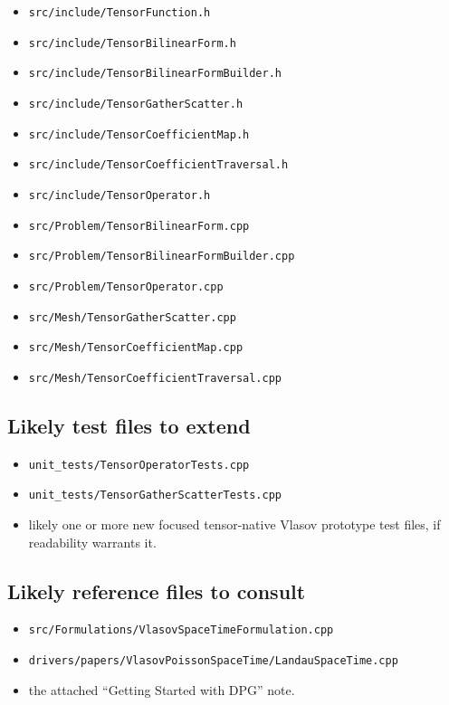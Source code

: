 \documentclass[11pt]{article}
\begin{document}
\begin{itemize}[leftmargin=2em]
\item \texttt{src/include/TensorFunction.h}
\item \texttt{src/include/TensorBilinearForm.h}
\item \texttt{src/include/TensorBilinearFormBuilder.h}
\item \texttt{src/include/TensorGatherScatter.h}
\item \texttt{src/include/TensorCoefficientMap.h}
\item \texttt{src/include/TensorCoefficientTraversal.h}
\item \texttt{src/include/TensorOperator.h}
\item \texttt{src/Problem/TensorBilinearForm.cpp}
\item \texttt{src/Problem/TensorBilinearFormBuilder.cpp}
\item \texttt{src/Problem/TensorOperator.cpp}
\item \texttt{src/Mesh/TensorGatherScatter.cpp}
\item \texttt{src/Mesh/TensorCoefficientMap.cpp}
\item \texttt{src/Mesh/TensorCoefficientTraversal.cpp}
\end{itemize}

\subsection{Likely test files to extend}

\begin{itemize}[leftmargin=2em]
\item \texttt{unit\_tests/TensorOperatorTests.cpp}
\item \texttt{unit\_tests/TensorGatherScatterTests.cpp}
\item likely one or more new focused tensor-native Vlasov prototype test files, if readability warrants it.
\end{itemize}

\subsection{Likely reference files to consult}

\begin{itemize}[leftmargin=2em]
\item \texttt{src/Formulations/VlasovSpaceTimeFormulation.cpp}
\item \texttt{drivers/papers/VlasovPoissonSpaceTime/LandauSpaceTime.cpp}
\item the attached ``Getting Started with DPG'' note.
\end{itemize}
\end{document}
